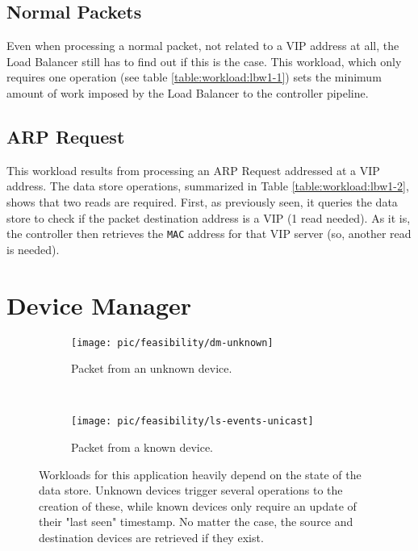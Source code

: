 \subsection{Normal Packets}
Even when processing a normal packet, not related to a VIP address at
all, the Load Balancer still has to find out if this is the case. This workload, which only requires one operation (see
table \ref{table:workload:lbw1-1}) sets the minimum amount of work imposed by
the Load Balancer to the controller pipeline. 

\subsection{ARP Request}
This workload  results  from processing an ARP Request addressed at a
VIP address. The data store operations, summarized in Table
\ref{table:workload:lbw1-2}, shows that two reads are
required. First, as previously seen,  it queries the data
store to check if the packet destination address is a VIP (1 read
needed). As it is, the controller then retrieves the \texttt{MAC} address for that
VIP server (so, another read is needed).


\section{Device Manager}
\label{sec:feasibility:dm}
\glsresetall


\begin{figure}
  \centering
  \begin{subfigure}[b]{0.5\textwidth}
                \centering
                \texttt{[image: pic/feasibility/dm-unknown]}
                \caption{Packet from an unknown device.}
                \label{fig:dm:interaction:unknown}
        \end{subfigure}%
        ~
        \begin{subfigure}[b]{0.5\textwidth}
                \centering
                \texttt{[image: pic/feasibility/ls-events-unicast]}
                \caption{Packet from a known device.}
                \label{fig:dm:interaction:known}
        \end{subfigure}
        \caption[Device Manager workload events]{Workloads for this application heavily depend on the state of the data store. Unknown devices trigger several operations to the creation of these, while known devices only require an update of their "last seen" timestamp. No matter the case, the source and destination devices are retrieved if they exist.}
        \label{fig:dm:interaction}
\end{figure}



